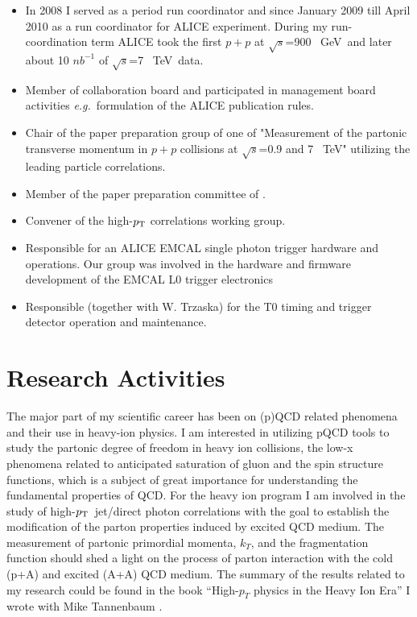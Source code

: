 \documentclass[12pt]{article}
\newcommand{\s} {\ensuremath{\sqrt{s}}}
\def\tev{\mbox{~TeV}}
\def\gev{\mbox{~GeV}}
\def\eg{{\it e.g.}}
\def\pt#1{\ensuremath{p_{\rm T#1}}}
\begin{document}
\begin{itemize}
\item In 2008 I served as a period run coordinator and since January 2009 till April 2010  as a run coordinator for ALICE experiment. During my run-coordination term ALICE took the first $p+p$ at \s=900 \gev\ and later about 10 $nb^{-1}$ of \s=7 \tev\ data.
\item Member of collaboration board and participated in management board activities \eg\ formulation of the ALICE publication rules.
\item Chair of the paper preparation group of one of  "Measurement of the partonic transverse momentum in $p+p$ collisions at \s=0.9 and 7 \tev" utilizing the leading particle correlations. 
\item Member of the paper preparation committee of \cite{Aamodt2012}.
\item Convener of the high-\pt{} correlations working group.
\item Responsible for an ALICE EMCAL single photon trigger hardware and operations. Our group was involved in the hardware and firmware development of the EMCAL L0 trigger electronics \cite{JiriKral2012}
\item Responsible (together with W. Trzaska) for the T0 timing and trigger detector operation and maintenance.
\end{itemize}



\section{Research Activities}
The major part of my scientific career has been on (p)QCD related phenomena and their use in heavy-ion physics.  I am interested in utilizing pQCD tools to study the partonic degree of freedom in heavy ion collisions, the low-x phenomena related to anticipated saturation of gluon and the spin structure functions, which is a subject of great importance for understanding the fundamental properties of QCD.  For the heavy ion program I am involved in the study of high-\pt{}\ jet/direct photon correlations with the goal to establish the modification of the parton properties induced by excited QCD medium.  The measurement of partonic primordial momenta, $k_T$, and the fragmentation function should shed a light on the process of parton interaction with the cold (p+A) and excited (A+A) QCD medium. 
The summary of the results related to my research could be found in the book ``High-$p_{T}$ physics in the Heavy Ion Era'' I wrote with Mike Tannenbaum  \cite{JanRak2013}.




\end{document}
